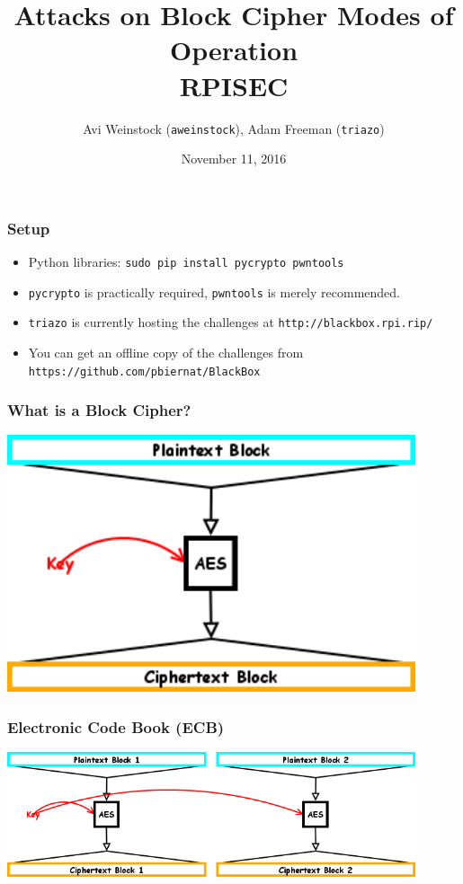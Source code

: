 \documentclass{beamer}
\title{Attacks on Block Cipher Modes of Operation\\RPISEC}
\date{November 11, 2016}
\author{Avi Weinstock (\Verb|aweinstock|), Adam Freeman (\Verb|triazo|)}
\begin{document}
\maketitle

\begin{frame}[fragile]
\frametitle{Setup}
\begin{itemize}
\item Python libraries: \verb|sudo pip install pycrypto pwntools|
\item
\verb|pycrypto| is practically required, \verb|pwntools| is merely recommended.
\item \verb|triazo| is currently hosting the challenges at \verb|http://blackbox.rpi.rip/|
\item You can get an offline copy of the challenges from \verb|https://github.com/pbiernat/BlackBox|
\end{itemize}
\end{frame}

\begin{frame}[fragile]
\frametitle{What is a Block Cipher?}
\includegraphics[width=0.9\textwidth]{diagram_images/SingleBlock.png}\\
\end{frame}

\begin{frame}[fragile]
\frametitle{Electronic Code Book (ECB)}
\includegraphics[width=0.9\textwidth]{diagram_images/ECB.png}\\
\end{frame}
\end{document}
